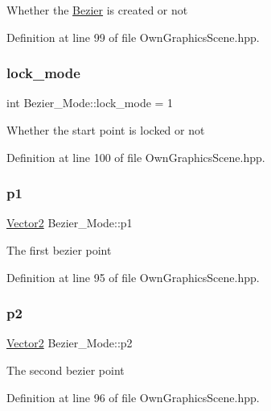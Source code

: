 Whether the \mbox{\hyperlink{classBezier}{Bezier}} is created or not 

Definition at line 99 of file Own\+Graphics\+Scene.\+hpp.

\mbox{\label{structBezier__Mode_afdb33ea2b7dc22c264580b86e5e9e998}} 
\subsubsection{\texorpdfstring{lock\+\_\+mode}{lock\_mode}}
{\footnotesize\ttfamily int Bezier\+\_\+\+Mode\+::lock\+\_\+mode = 1}

Whether the start point is locked or not 

Definition at line 100 of file Own\+Graphics\+Scene.\+hpp.

\mbox{\label{structBezier__Mode_a2d7c5ccccb03114fd1b26a20843a59e4}} 
\subsubsection{\texorpdfstring{p1}{p1}}
{\footnotesize\ttfamily \mbox{\hyperlink{classVector2}{Vector2}} Bezier\+\_\+\+Mode\+::p1}

The first bezier point 

Definition at line 95 of file Own\+Graphics\+Scene.\+hpp.

\mbox{\label{structBezier__Mode_a96ed0f4076e540e5a8789f25f9bf65e9}} 
\subsubsection{\texorpdfstring{p2}{p2}}
{\footnotesize\ttfamily \mbox{\hyperlink{classVector2}{Vector2}} Bezier\+\_\+\+Mode\+::p2}

The second bezier point 

Definition at line 96 of file Own\+Graphics\+Scene.\+hpp.

\mbox{\label{structBezier__Mode_ad9fbff84a5248923ceb29433dc58f49b}} 
